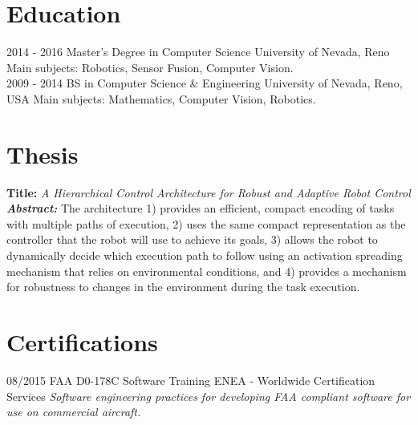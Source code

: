 \documentclass[]{friggeri-cv}
\begin{document}
\section{Education}
\begin{entrylist}
  \entry
    {2014 - 2016}
    {Master's Degree in Computer Science}
    {University of Nevada, Reno}
    {Main subjects: Robotics, Sensor Fusion, Computer Vision.\\}
  \entry
    {2009 - 2014}
    {BS in Computer Science \& Engineering}
    {University of Nevada, Reno, USA}
    {Main subjects: Mathematics, Computer Vision, Robotics.\\}
\end{entrylist}

\section{Thesis}
{\textbf{Title:} \emph{A Hierarchical Control Architecture for Robust and Adaptive Robot Control \\ \textbf{Abstract:}}}
{The architecture 1) provides an efficient, compact encoding of tasks with multiple paths of execution, 2) uses the same compact representation as the controller that the robot will use to achieve its goals, 3) allows the robot to dynamically decide which execution path to follow using an activation spreading mechanism that relies on environmental conditions, and 4) provides a mechanism for robustness to changes in the environment during the task execution.}

\section{Certifications}
\begin{entrylist}
  \entry
    {08/2015}
    {FAA D0-178C Software Training}
    {ENEA - Worldwide Certification Services}
    {\emph{Software engineering practices for developing FAA compliant software for use on commercial aircraft.}}
\end{entrylist}
\end{document}

